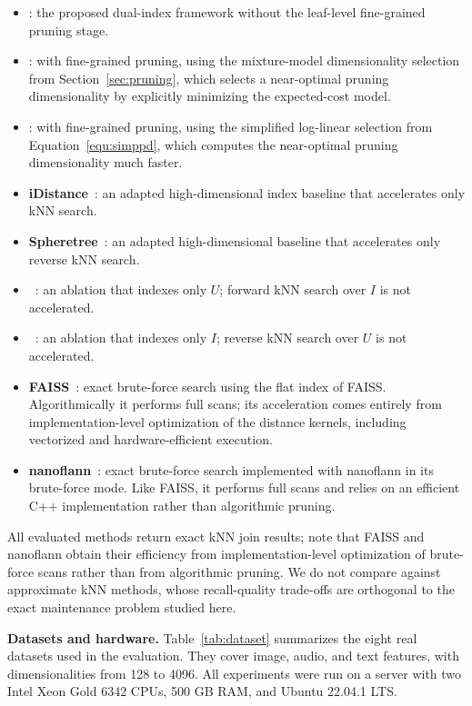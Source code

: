 \begin{itemize}
    \item \textbf{\dualtree}: the proposed dual-index framework without the leaf-level fine-grained pruning stage.
    \item \textbf{\dualtreeopt}: \dualtree with fine-grained pruning, using the mixture-model dimensionality selection from Section~\ref{sec:pruning}, which selects a near-optimal pruning dimensionality by explicitly minimizing the expected-cost model.
    \item \textbf{\dualtreefast}: \dualtree with fine-grained pruning, using the simplified log-linear selection from Equation~\ref{equ:simppd}, which computes the near-optimal pruning dimensionality much faster.
    \item \textbf{iDistance}~\cite{jagadish2005idistance}: an adapted high-dimensional index baseline that accelerates only kNN search.
    \item \textbf{Spheretree}~\cite{yu2010high}: an adapted high-dimensional baseline that accelerates only reverse kNN search.
    \item \textbf{\hdrtree}~\cite{yang2014continuous}: an ablation that indexes only $U$; forward kNN search over $I$ is not accelerated.
    \item \textbf{\deltatree}~\cite{cui2003contorting}: an ablation that indexes only $I$; reverse kNN search over $U$ is not accelerated.
    \item \textbf{FAISS}~\cite{douze2026faiss}: exact brute-force search using the flat index of FAISS. Algorithmically it performs full scans; its acceleration comes entirely from implementation-level optimization of the distance kernels, including vectorized and hardware-efficient execution.
    \item \textbf{nanoflann}~\cite{blanco2014nanoflann}: exact brute-force search implemented with nanoflann in its brute-force mode. Like FAISS, it performs full scans and relies on an efficient C++ implementation rather than algorithmic pruning.
\end{itemize}

All evaluated methods return exact kNN join results; note that FAISS and nanoflann obtain their efficiency from implementation-level optimization of brute-force scans rather than from algorithmic pruning. We do not compare against approximate kNN methods, whose recall-quality trade-offs are orthogonal to the exact maintenance problem studied here.

\noindent\textbf{Datasets and hardware.}
Table~\ref{tab:dataset} summarizes the eight real datasets used in the evaluation. They cover image, audio, and text features, with dimensionalities from 128 to 4096. All experiments were run on a server with two Intel Xeon Gold 6342 CPUs, 500 GB RAM, and Ubuntu 22.04.1 LTS.

